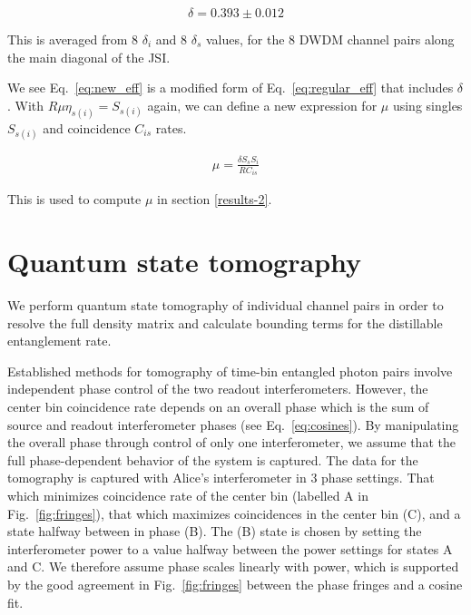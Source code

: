 \documentclass[11pt]{caltech_thesis} %
\begin{document}
$$\delta = 0.393 \pm 0.012$$

This is averaged from 8 $\delta_i$ and 8 $\delta_s$ values, for the 8 DWDM channel pairs along the main diagonal of the JSI.

We see Eq.~\ref{eq:new_eff} is a modified form of Eq.~\ref{eq:regular_eff} that includes $\delta$. With $R \mu \eta_{s(i)}=S_{s(i)}$ again, we can define a new expression for $\mu$ using singles $S_{s(i)}$ and coincidence $C_{is}$ rates.

\hypertarget{eq:new_mu}{}{
\begin{align}
    \mu = \frac{\delta S_s S_i }{R C_{is}} \label{new_mu}
\end{align}
}

This is used to compute $\mu$ in section \ref{results-2}.

\hypertarget{quantum-state-tomography}{%
\section{Quantum state tomography}\label{quantum-state-tomography}}

We perform quantum state tomography of individual channel pairs in order to resolve the full density matrix and calculate bounding terms for the distillable entanglement rate.

Established methods for tomography of time-bin entangled photon pairs involve independent phase control of the two readout interferometers. However, the center bin coincidence rate depends on an overall phase which is the sum of source and readout interferometer phases (see Eq.~\ref{eq:cosines}). By manipulating the overall phase through control of only one interferometer, we assume that the full phase-dependent behavior of the system is captured. The data for the tomography is captured with Alice's interferometer in 3 phase settings. That which minimizes coincidence rate of the center bin (labelled A in Fig.~\ref{fig:fringes}), that which maximizes coincidences in the center bin (C), and a state halfway between in phase (B). The (B) state is chosen by setting the interferometer power to a value halfway between the power settings for states A and C. We therefore assume phase scales linearly with power, which is supported by the good agreement in Fig.~\ref{fig:fringes} between the phase fringes and a cosine fit.
\end{document}
